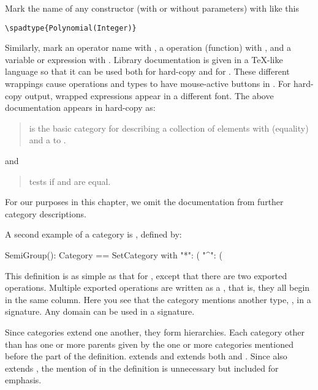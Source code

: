 {{{\sloppy
Mark the name of any constructor (with or without parameters) with
 like this
\begin{verbatim}
\spadtype{Polynomial(Integer)}
\end{verbatim}
Similarly, mark an
operator name with ,
a \Language{} operation (function) with , and a
variable or \Language{} expression with
.
Library documentation is given in a \TeX{}-like language so that
it can be used both for hard-copy and for \Browse{}.
These different wrappings cause operations and types to have
mouse-active buttons in \Browse{}.
For hard-copy output, wrapped expressions appear in a different font.
The above documentation appears in hard-copy as:

}
%
\begin{quotation}
%
 is the basic category
for describing a collection of elements with \spadop{=}
(equality) and a  to .
%
\end{quotation}
%
and
%
\begin{quotation}
%
 tests if  and  are equal.
%
\end{quotation}
%

For our purposes in this chapter, we omit the documentation from further
category descriptions.


A second example of a category is
, defined by:

\begin{xmpLines}
SemiGroup(): Category == SetCategory with
      "*":  (%
      "^": (%
\end{xmpLines}

This definition is as simple as that for ,
except that there are two exported operations.
Multiple exported operations are written as a ,
that is, they all begin in the same column.
Here you see that the category mentions another type,
, in a signature.
Any domain can be used in a signature.

Since categories extend one another, they form hierarchies.
Each category other than  has one or more parents given
by the one or more categories mentioned before the  part of
the definition.
 extends  and
 extends both  and
.
Since  also extends ,
the mention of  in the definition is unnecessary but
included for emphasis.

}}
